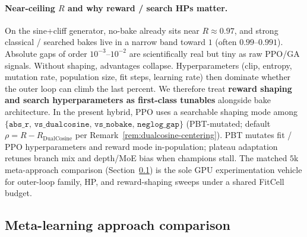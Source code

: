 \paragraph{Near-ceiling $R$ and why reward / search HPs matter.}
\label{sec:reward-shaping}
On the sine{+}cliff generator, no-bake already sits near $R\approx 0.97$, and strong classical / searched bakes live in a narrow band toward $1$ (often $0.99$--$0.991$).
Absolute gaps of order $10^{-3}$--$10^{-2}$ are scientifically real but tiny as raw PPO/GA signals.
Without shaping, advantages collapse.
Hyperparameters (clip, entropy, mutation rate, population size, fit steps, learning rate) then dominate whether the outer loop can climb the last percent.
We therefore treat \textbf{reward shaping and search hyperparameters as first-class tunables} alongside bake architecture.
In the present hybrid, PPO uses a searchable shaping mode among $\{\texttt{abs\_r},\,\texttt{vs\_dualcosine},\,\texttt{vs\_nobake},\,\texttt{neglog\_gap}\}$ (PBT-mutated; default $\rho = R - R_{\mathrm{DualCosine}}$ per Remark~\ref{rem:dualcosine-centering}).
PBT mutates fit / PPO hyperparameters and reward mode in-population; plateau adaptation retunes branch mix and depth/MoE bias when champions stall.
The matched $5$k meta-approach comparison (Section~\ref{sec:meta-compare}) is the sole GPU experimentation vehicle for outer-loop family, HP, and reward-shaping sweeps under a shared FitCell budget.

\subsection{Meta-learning approach comparison}
\label{sec:meta-compare}

